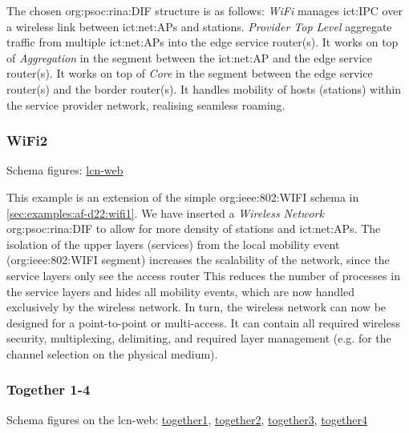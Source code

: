 The chosen \acs{org:psoc:rina:DIF} structure is as follows:
\textit{WiFi} manages \ac{ict:IPC} over a wireless link between \acp{ict:net:AP} and stations.
\textit{Provider Top Level} aggregate traffic from multiple \acp{ict:net:AP} into the edge service router(s).
It works on top of \textit{Aggregation} in the segment between the \acs{ict:net:AP} and the edge service router(s).
It works on top of \textit{Core} in the segment between the edge service router(s) and the border router(s).
It handles mobility of hosts (stations) within the service provider network, realising seamless roaming.



\subsubsection{WiFi2}
Schema figures: \href{https://vdmeer.github.io/skb/ipc/lcn-examples/arcfire/af-d22-wifi2/index.html}{lcn-web}

This example is an extension of the simple \acs{org:ieee:802:WIFI} schema in \autoref{sec:examples:af-d22:wifi1}.
We have inserted a \textit{Wireless Network} \acs{org:psoc:rina:DIF} to allow for more density of stations and \acp{ict:net:AP}.
The isolation of the upper layers (services) from the local mobility event (\acs{org:ieee:802:WIFI} segment) increases the scalability of the network, since the service layers only see the access router
This reduces the number of processes in the service layers and hides all mobility events, which are now handled exclusively by the wireless network.
In turn, the wireless network can now be designed for a point-to-point or multi-access.
It can contain all required wireless security, multiplexing, delimiting, and required layer management (e.g. for the channel selection on the physical medium).



\subsubsection{Together 1-4}
\label{sec:examples:af-d22:together1-4}
Schema figures on the lcn-web: \href{https://vdmeer.github.io/skb/ipc/lcn-examples/arcfire/af-d22-together1/index.html}{together1}, \href{https://vdmeer.github.io/skb/ipc/lcn-examples/arcfire/af-d22-together2/index.html}{together2}, \href{https://vdmeer.github.io/skb/ipc/lcn-examples/arcfire/af-d22-together3/index.html}{together3}, \href{https://vdmeer.github.io/skb/ipc/lcn-examples/arcfire/af-d22-together4/index.html}{together4}

